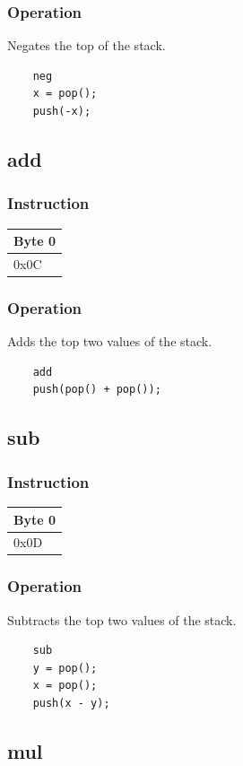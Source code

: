 \documentclass[11pt]{report}
\newcommand{\onebyteinstruction}[1]{
\begin{tabular}{|p{3.9em}|}
\hline
\tiny{Byte 0} \\ \hline
#1  \\ \hline
\end{tabular}
}
\begin{document}
\subsubsection{Operation}
Negates the top of the stack.

	\begin{lstlisting}
	neg
	x = pop();
	push(-x);
	\end{lstlisting}

\subsection{add}
\subsubsection{Instruction}
\onebyteinstruction{0x0C}

\subsubsection{Operation}
Adds the top two values of the stack.

	\begin{lstlisting}
	add
	push(pop() + pop());
	\end{lstlisting}

\subsection{sub}
\subsubsection{Instruction}
\onebyteinstruction{0x0D}

\subsubsection{Operation}
Subtracts the top two values of the stack.

	\begin{lstlisting}
	sub
	y = pop();
	x = pop();
	push(x - y);
	\end{lstlisting}

\subsection{mul}
\end{document}
